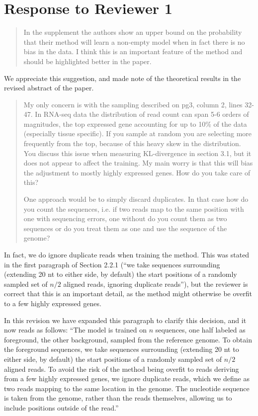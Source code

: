 \documentclass{article}
\begin{document}
\section*{Response to Reviewer 1}

\begin{quote}
In the supplement the authors show an upper bound on the probability that their
method will learn a non-empty model when in fact there is no bias in the data. I
think this is an important feature of the method and should be highlighted
better in the paper.
\end{quote}

We appreciate this suggestion, and made note of the theoretical results in the
revised abstract of the paper.


\begin{quote}
My only concern is with the sampling described on pg3, column 2, lines 32-47.
In RNA-seq data the distribution of read count can span 5-6 orders of
magnitudes, the top expressed gene accounting for up to 10\% of the data
(especially tissue specific). If you sample at random you are selecting more
frequently from the top, because of this heavy skew in the distribution. You
discuss this issue when measuring KL-divergence in section 3.1, but it does not
appear to affect the training. My main worry is that this will bias the
adjustment to mostly highly expressed genes. How do you take care of this?

One approach would be to simply discard duplicates. In that case how do you
count the sequences, i.e. if two reads map to the same position with one with
sequencing errors, one without do you count them as two sequences or do you
treat them as one and use the sequence of the genome?
\end{quote}

In fact, we do ignore duplicate reads when training the method. This was stated
in the first paragraph of Section 2.2.1 (``we take sequences surrounding
(extending 20 nt to either side, by default) the start positions of a randomly
sampled set of $n/2$ aligned reads, ignoring duplicate reads''), but the reviewer is
correct that this is an important detail, as the method might otherwise be
overfit to a few highly expressed genes.

In this revision we have expanded this paragraph to clarify this decision, and
it now reads as follows:
``The model is trained on $n$ sequences, one half labeled as foreground, the other
background, sampled from the reference genome. To obtain the foreground
sequences, we take sequences surrounding (extending 20 nt to either side, by
default) the start positions of a randomly sampled set of $n/2$ aligned reads.
To avoid the risk of the method being overfit to reads deriving from a few
highly expressed genes, we ignore duplicate reads, which we define as two reads
mapping to the same location in the genome. The nucleotide sequence is taken
from the genome, rather than the reads themselves, allowing us to include
positions outside of the read.''
\end{document}
